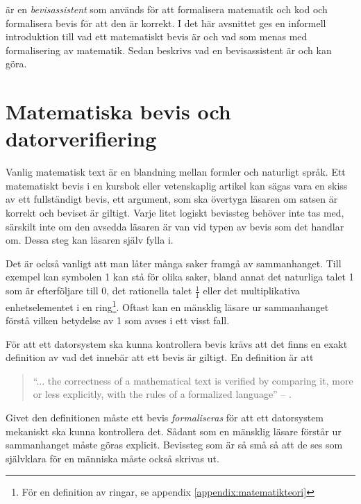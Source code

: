 \coq är en \emph{bevisassistent} som används för att formalisera matematik och
kod och formalisera bevis för att den är korrekt. I det här avsnittet ges en
informell introduktion till vad ett matematiskt bevis är och vad som menas med
formalisering av matematik. Sedan beskrivs vad en bevisassistent är och kan
göra.

\section{Matematiska bevis och datorverifiering}
Vanlig matematisk text är en blandning mellan formler och naturligt språk. Ett
matematiskt bevis i en kursbok eller vetenskaplig artikel kan sägas vara en
skiss av ett fullständigt bevis, ett argument, som ska övertyga läsaren om
satsen är korrekt och beviset är giltigt. Varje litet logiskt bevissteg behöver
inte tas med, särskilt inte om den avsedda läsaren är van vid typen av bevis
som det handlar om. Dessa steg kan läsaren själv fylla i.


Det är också vanligt att man låter många saker framgå av sammanhanget. Till
exempel kan symbolen 1 kan stå för olika saker, bland annat det naturliga talet
1 som är efterföljare till 0, det rationella talet $\frac{1}{1}$ eller det
multiplikativa enhetselementet i en ring\footnote{För en definition av ringar,
se appendix \ref{appendix:matematikteori}}. Oftast kan en mänsklig läsare ur
sammanhanget förstå vilken betydelse av 1 som avses i ett visst fall.

För att ett datorsystem ska kunna kontrollera bevis krävs att det finns en
exakt definition av vad det innebär att ett bevis är giltigt. En definition är
att
\begin{quote}
``... the correctness of a mathematical text is verified by comparing it, more or
less explicitly, with the rules of a formalized language'' -- \cite{bourbaki1968sets}.
\end{quote}

Givet den definitionen måste ett bevis \emph{formaliseras} för att ett
datorsystem mekaniskt ska kunna kontrollera det. Sådant som en mänsklig läsare
förstår ur sammanhanget måste göras explicit. Bevissteg som är så små så att de
ses som självklara för en människa måste också skrivas ut.

